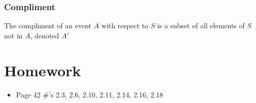 \documentclass{book}
\begin{document}
\subsubsection{Compliment}
The compliment of an event $A$ with respect to $S$ is a subset of all elements of $S$ not in $A$, denoted $A'$

\section{Homework}
\begin{itemize}
\item Page 42 \#'s 2.3, 2.6, 2.10, 2.11, 2.14, 2.16, 2.18
\end{itemize}




\newpage
\nocite{textbook}
\printbibliography
\end{document}
